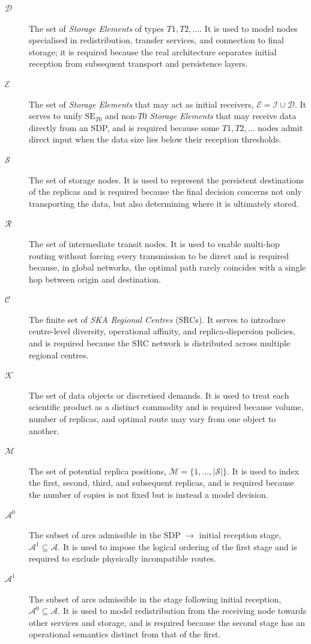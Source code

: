 \documentclass[a4paper,fleqn]{cas-dc}
\newcommand{\A}{\mathcal{A}}
\newcommand{\Iset}{\mathcal{I}}
\newcommand{\Dset}{\mathcal{D}}
\newcommand{\Eset}{\mathcal{E}}
\newcommand{\Sset}{\mathcal{S}}
\newcommand{\Rset}{\mathcal{R}}
\newcommand{\Kset}{\mathcal{K}}
\newcommand{\Mset}{\mathcal{M}}
\newcommand{\Cset}{\mathcal{C}}
\newcommand{\Apre}{\mathcal{A}^{0}}
\newcommand{\Apost}{\mathcal{A}^{1}}
\begin{document}
\begin{description}
\item[\(\Dset\)] The set of \emph{Storage Elements} of types \(T1, T2, \dots\). It is used to model nodes specialised in redistribution, transfer services, and connection to final storage; it is required because the real architecture separates initial reception from subsequent transport and persistence layers.

\item[\(\Eset\)] The set of \emph{Storage Elements} that may act as initial receivers, \(\Eset=\Iset\cup\Dset\). It serves to unify \(\mathrm{SE}_{T0}\) and non-\(T0\) \emph{Storage Elements} that may receive data directly from an SDP, and is required because some \(T1, T2, \dots\) nodes admit direct input when the data size lies below their reception thresholds. 

\item[\(\Sset\)] The set of storage nodes. It is used to represent the persistent destinations of the replicas and is required because the final decision concerns not only transporting the data, but also determining where it is ultimately stored. 

\item[\(\Rset\)] The set of intermediate transit nodes. It is used to enable multi-hop routing without forcing every transmission to be direct and is required because, in global networks, the optimal path rarely coincides with a single hop between origin and destination. 

\item[\(\Cset\)] The finite set of \emph{SKA Regional Centres} (SRCs). It serves to introduce centre-level diversity, operational affinity, and replica-dispersion policies, and is required because the SRC network is distributed across multiple regional centres. 

\item[\(\Kset\)] The set of data objects or discretised demands. It is used to treat each scientific product as a distinct commodity and is required because volume, number of replicas, and optimal route may vary from one object to another. 

\item[\(\Mset\)] The set of potential replica positions, \(\Mset = \{1,\dots,|\Sset|\}\). It is used to index the first, second, third, and subsequent replicas, and is required because the number of copies is not fixed but is instead a model decision. 

\item[\(\Apre\)] The subset of arcs admissible in the SDP \(\to\) initial reception stage, \(\Apost\subseteq\A\). It is used to impose the logical ordering of the first stage and is required to exclude physically incompatible routes. 

\item[\(\Apost\)] The subset of arcs admissible in the stage following initial reception, \(\Apre\subseteq\A\). It is used to model redistribution from the receiving node towards other services and storage, and is required because the second stage has an operational semantics distinct from that of the first. 

\end{description}
\end{document}
